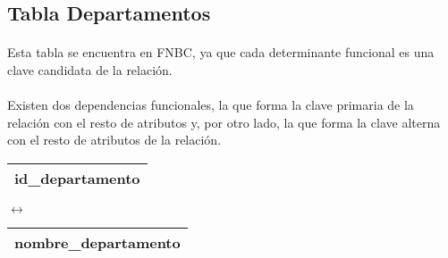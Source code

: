 \subsection{Tabla Departamentos}

  \paragraph{}Esta tabla se encuentra en FNBC, ya que cada determinante
  funcional es una clave candidata de la relación.

  \paragraph{}Existen dos dependencias funcionales, la que forma la clave
  primaria de la relación con el resto de atributos y, por otro lado, la que
  forma la clave alterna con el resto de atributos de la relación.

  \begin{center}
    \begin{minipage}{3.7cm}{\begin{flushright}\begin{tabular}{ | c | }
                  \hline
                  id\_departamento \\
                  \hline
                 \end{tabular}\end{flushright} }
    \end{minipage}
    \begin{minipage}{0.8cm}{$\longleftrightarrow$}
    \end{minipage}
    \begin{minipage}{5.9cm}{\begin{tabular}{ | c | }
                  \hline
                  nombre\_departamento \\
                  \hline
                 \end{tabular} }
    \end{minipage}
  \end{center}
